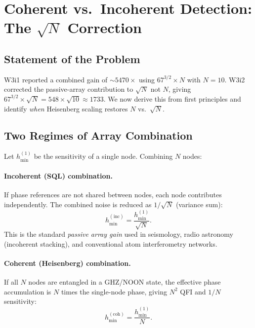 \documentclass[11pt]{article}
\theoremstyle{definition}
\theoremstyle{remark}
\begin{document}
\section{Coherent vs.\ Incoherent Detection: The $\sqrt{N}$ Correction}

\subsection{Statement of the Problem}

W3i1 reported a combined gain of $\sim 5470\times$ using $67^{3/2} \times N$
with $N = 10$. W3i2 corrected the passive-array contribution to $\sqrt{N}$ not
$N$, giving $67^{3/2} \times \sqrt{N} = 548 \times \sqrt{10} \approx 1733$.
We now derive this from first principles and identify \emph{when} Heisenberg
scaling restores $N$ vs.\ $\sqrt{N}$.

\subsection{Two Regimes of Array Combination}

Let $h_{\min}^{(1)}$ be the sensitivity of a single node. Combining $N$ nodes:

\paragraph{Incoherent (SQL) combination.}
If phase references are not shared between nodes, each node contributes
independently. The combined noise is reduced as $1/\sqrt{N}$ (variance sum):
\begin{equation}
h_{\min}^{(\mathrm{inc})} = \frac{h_{\min}^{(1)}}{\sqrt{N}}.
\label{eq:incoherent}
\end{equation}
This is the standard \emph{passive array gain} used in seismology, radio
astronomy (incoherent stacking), and conventional atom interferometry networks.

\paragraph{Coherent (Heisenberg) combination.}
If all $N$ nodes are entangled in a GHZ/NOON state, the effective phase
accumulation is $N$ times the single-node phase, giving $N^2$ QFI and
$1/N$ sensitivity:
\begin{equation}
h_{\min}^{(\mathrm{coh})} = \frac{h_{\min}^{(1)}}{N}.
\label{eq:coherent}
\end{equation}
\end{document}

